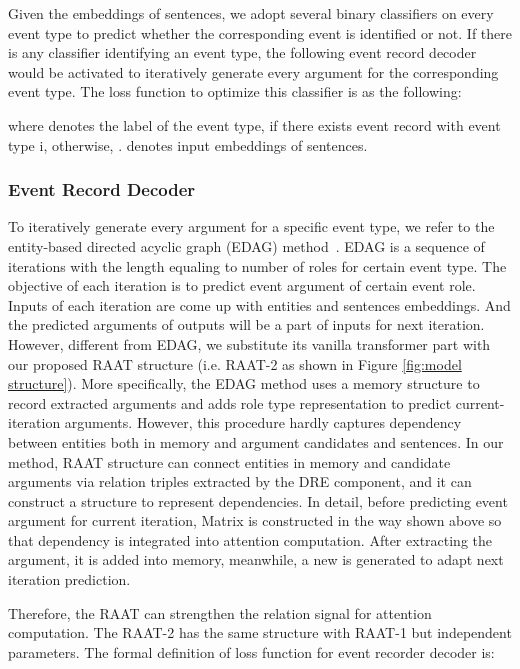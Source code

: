 \documentclass[11pt]{article}
\begin{document}
Given the embeddings of sentences, we adopt several binary classifiers on every event type to predict whether the corresponding event is identified or not. If there is any classifier identifying an event type, the following event record decoder would be activated to iteratively generate every argument for the corresponding event type. The loss function to optimize this classifier is as the following:

where  denotes the label of the  event type,  if there exists event record with event type i, otherwise, .  denotes input embeddings of sentences.



\subsubsection{Event Record Decoder}

To iteratively generate every argument for a specific event type, we refer to the entity-based directed acyclic graph (EDAG) method~\cite{Doc2EDAG}. EDAG is a sequence of iterations with the length equaling to number of roles for certain event type. The objective of each iteration is to predict event argument of certain event role.
Inputs of each iteration are come up with entities and sentences embeddings. And the predicted arguments of outputs will be a part of inputs for next iteration. However, different from EDAG, we substitute its vanilla transformer part with our proposed RAAT structure (i.e. RAAT-2 as shown in Figure \ref{fig:model structure}). More specifically, the EDAG method uses a memory structure to record extracted arguments and adds role type representation to predict current-iteration arguments. However, this procedure hardly captures dependency between entities both in memory and argument candidates and sentences. In our method, RAAT structure can connect entities in memory and candidate arguments via relation triples extracted by the DRE component, and it can construct a structure to represent dependencies. In detail, before predicting event argument for current iteration, Matrix  is constructed in the way shown above so that dependency is integrated into attention computation. After extracting the argument, it is added into memory, meanwhile, a new  is generated to adapt next iteration prediction.

Therefore, the RAAT can strengthen the relation signal for attention computation. The RAAT-2 has the same structure with RAAT-1 but independent parameters. The formal definition of loss function for event recorder decoder is:
\end{document}
